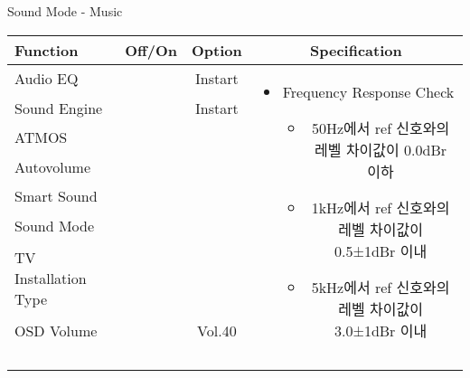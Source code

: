 \begin{frame}[t]{Sound Mode - Music}
\begin{tiny}
\begin{tabular}{@{}lccc@{}}
\toprule
Function & Off/On & Option & Specification \\
\midrule
Audio EQ & \color{black}{Off} & Instart &
\multirow{10}{60mm}{
\begin{itemize}
\item Frequency Response Check
	\begin{itemize}	
	\item 50Hz에서 ref 신호와의 레벨 차이값이 0.0dBr 이하
	\item 1kHz에서 ref 신호와의 레벨 차이값이 0.5±1dBr 이내
	\item 5kHz에서 ref 신호와의 레벨 차이값이 3.0±1dBr 이내	
	\end{itemize}
\end{itemize}
} \\
Sound Engine & \color{blue}{On} & Instart & \\
ATMOS & \color{black}{Off}  & & \\
Autovolume & \color{black}{Off} & & \\
Smart Sound & \color{black}{Off} & & \\
Sound Mode & \color{blue}{On} & \color{blue}{Music} & \\
TV Installation Type & \color{blue}{On} & \color{black}{Standtype1} & \\
OSD Volume & \color{blue}{On} & Vol.40 & \\
& & & \\
& & & \\
& & & \\
& & & \\
\midrule
\end{tabular}
\end{tiny}


\end{frame}
